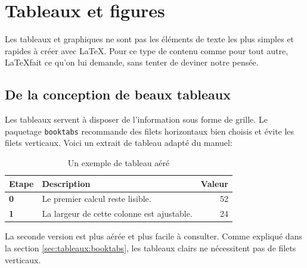 \documentclass{book}
\begin{document}
\chapter{Tableaux et figures}
\label{chap:tableaux}

Les tableaux et graphiques ne sont pas les éléments de texte les plus simples
et rapides à créer avec \LaTeX. Pour ce type de contenu comme pour tout autre,
\LaTeX fait ce qu'on lui demande, sans tenter de deviner notre pensée.

\section{De la conception de beaux tableaux}
\label{sec:tableaux:booktabs}

Les tableaux servent à disposer de l'information sous forme de grille. Le
paquetage \texttt{booktabs} recommande des filets horizontaux bien choisis et
évite les filets verticaux. Voici un extrait de tableau adapté du manuel:

\begin{table}
\caption{Un exemple de tableau aéré}\label{tab:beau}
\begin{tabularx}{\textwidth}{>{\bfseries}lXr}
\toprule
Etape & Description & Valeur \\
\midrule
0 & Le premier calcul reste lisible. & 52 \\
1 & La largeur de cette colonne est ajustable. & 24 \\
\bottomrule
\end{tabularx}
\end{table}

La seconde version est plus aérée et plus facile à consulter. Comme expliqué
dans la section \autoref{sec:tableaux:booktabs}, les tableaux clairs ne
nécessitent pas de filets verticaux.
\end{document}
